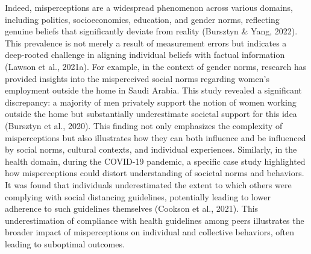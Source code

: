 Indeed, misperceptions are a widespread phenomenon across various domains, including politics, socioeconomics, education, and gender norms, reflecting genuine beliefs that significantly deviate from reality (Bursztyn & Yang, 2022). This prevalence is not merely a result of measurement errors but indicates a deep-rooted challenge in aligning individual beliefs with factual information (Lawson et al., 2021a). For example, in the context of gender norms, research has provided insights into the misperceived social norms regarding women's employment outside the home in Saudi Arabia. This study revealed a significant discrepancy: a majority of men privately support the notion of women working outside the home but substantially underestimate societal support for this idea (Bursztyn et al., 2020). This finding not only emphasizes the complexity of misperceptions but also illustrates how they can both influence and be influenced by social norms, cultural contexts, and individual experiences. Similarly, in the health domain, during the COVID-19 pandemic, a specific case study highlighted how misperceptions could distort understanding of societal norms and behaviors. It was found that individuals underestimated the extent to which others were complying with social distancing guidelines, potentially leading to lower adherence to such guidelines themselves (Cookson et al., 2021). This underestimation of compliance with health guidelines among peers illustrates the broader impact of misperceptions on individual and collective behaviors, often leading to suboptimal outcomes.

